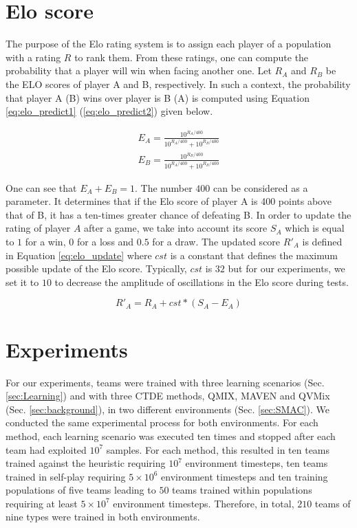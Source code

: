 \section{Elo score}
\label{app:elo}
The purpose of the Elo rating system \citep{elo1978rating} is to assign each player of a population with a rating $R$ to rank them.
From these ratings, one can compute the probability that a player will win when facing another one.
Let $R_A$ and $R_B$ be the ELO scores of player A and B, respectively.
In such a context, the probability that player A (B) wins over player is B (A) is computed using Equation \ref{eq:elo_predict1} (\ref{eq:elo_predict2}) given below.

\begin{align}
    \label{eq:elo_predict1}
    E_A=\frac{10^{R_A/400}}{10^{R_A/400} + 10^{R_B/400}}
    \\
    \label{eq:elo_predict2}
    E_B=\frac{10^{R_B/400}}{10^{R_A/400} + 10^{R_B/400}}
\end{align}%

One can see that $E_A + E_B = 1$.
The number $400$ can be considered as a parameter.
It determines that if the Elo score of player A is 400 points above that of B, it has a ten-times greater chance of defeating B.
In order to update the rating of player $A$ after a game, we take into account its score $S_A$ which is equal to $1$ for a win, $0$ for a loss and $0.5$ for a draw.
The updated score $R'_A$ is defined in Equation \ref{eq:elo_update} where $cst$ is a constant that defines the maximum possible update of the Elo score.
Typically, $cst$ is $32$ but for our experiments, we set it to $10$ to decrease the amplitude of oscillations in the Elo score during tests.

\begin{equation}
    \label{eq:elo_update}
    R'_A = R_A + cst * (S_A - E_A)
\end{equation}



\section{Experiments}

For our experiments, teams were trained with three learning scenarios (Sec. \ref{sec:Learning}) and with three CTDE methods, QMIX, MAVEN and QVMix (Sec. \ref{sec:background}), in two different environments (Sec. \ref{sec:SMAC}).
We conducted the same experimental process for both environments.
For each method, each learning scenario was executed ten times and stopped after each team had exploited $10^7$ samples.
For each method, this resulted in ten teams trained against the heuristic requiring $10^7$ environment timesteps, ten teams trained in self-play requiring $5\times10^6$ environment timesteps and ten training populations of five teams leading to $50$ teams trained within populations requiring at least $5\times10^7$ environment timesteps.
Therefore, in total, $210$ teams of nine types were trained in both environments.

